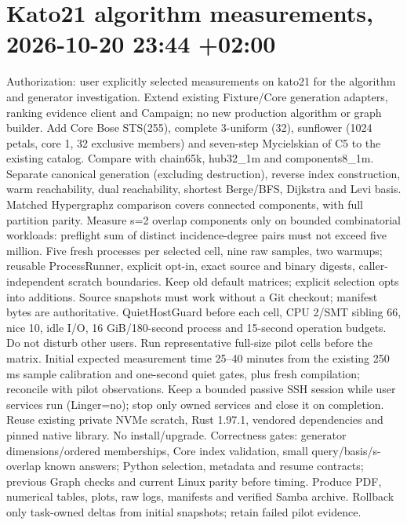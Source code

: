 \documentclass[11pt,a4paper]{article}
\begin{document}
\section*{Kato21 algorithm measurements, 2026-10-20 23:44 +02:00}
Authorization: user explicitly selected measurements on kato21 for the algorithm
and generator investigation. Extend existing Fixture/Core generation adapters,
ranking evidence client and Campaign; no new production algorithm or graph builder.
Add Core Bose STS(255), complete 3-uniform (32), sunflower (1024 petals, core 1,
32 exclusive members) and seven-step Mycielskian of C5 to the existing catalog.
Compare with chain65k, hub32\_1m and components8\_1m.
Separate canonical generation (excluding destruction), reverse index construction,
warm reachability, dual reachability, shortest Berge/BFS, Dijkstra and Levi basis.
Matched Hypergraphz comparison covers connected components, with full partition parity.
Measure s=2 overlap components only on bounded combinatorial workloads: preflight
sum of distinct incidence-degree pairs must not exceed five million.
Five fresh processes per selected cell, nine raw samples, two warmups; reusable
ProcessRunner, explicit opt-in, exact source and binary digests, caller-independent
scratch boundaries. Keep old default matrices; explicit selection opts into additions.
Source snapshots must work without a Git checkout; manifest bytes are authoritative.
QuietHostGuard before each cell, CPU 2/SMT sibling 66, nice 10, idle I/O,
16 GiB/180-second process and 15-second operation budgets. Do not disturb other users.
Run representative full-size pilot cells before the matrix. Initial expected
measurement time 25--40 minutes from the existing 250 ms sample calibration and
one-second quiet gates, plus fresh compilation; reconcile with pilot observations.
Keep a bounded passive SSH session while user services run (Linger=no); stop only
owned services and close it on completion. Reuse existing private NVMe scratch,
Rust 1.97.1, vendored dependencies and pinned native library. No install/upgrade.
Correctness gates: generator dimensions/ordered memberships, Core index validation,
small query/basis/s-overlap known answers; Python selection, metadata and resume
contracts; previous Graph checks and current Linux parity before timing.
Produce PDF, numerical tables, plots, raw logs, manifests and verified Samba archive.
Rollback only task-owned deltas from initial snapshots; retain failed pilot evidence.
\end{document}
